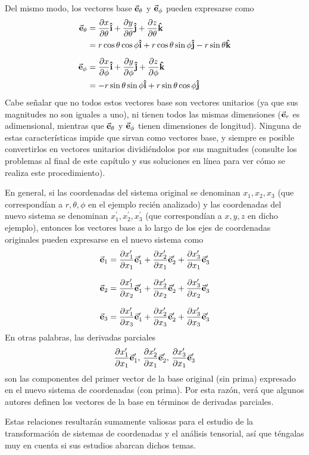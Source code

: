 \documentclass[hidelinks,12pt]{article}
\begin{document}
Del mismo modo, los vectores base $\va{e}_{\theta}$ y $\va{e}_{\phi}$ pueden expresarse como
\begin{align*}
    \va{e}_{\theta} &= \pdv{x}{\theta} \vu{i} + \pdv{y}{\theta} \vu{j} + \pdv{z}{\theta} \vu{k} \\
    &= r \cos \theta \cos \phi \vu{i} + r \cos \theta \sin \phi \vu{j} - r \sin \theta \vu{k} \\[0.5em]
    \va{e}_{\phi} &= \pdv{x}{\phi} \vu{i} + \pdv{y}{\phi} \vu{j} + \pdv{z}{\phi} \vu{k} \\
    &= - r \sin \theta \sin \phi \vu{i} + r \sin \theta \cos \phi \vu{j}
\end{align*}
Cabe señalar que no todos estos vectores base son vectores unitarios (ya que sus magnitudes no son iguales a uno), ni tienen todos las mismas dimensiones ($\va{e}_{r}$ es adimensional, mientras que $\va{e}_{\theta}$ y $\va{e}_{\phi}$ tienen dimensiones de longitud). Ninguna de estas características impide que sirvan como vectores base, y siempre es posible convertirlos en vectores unitarios dividiéndolos por sus magnitudes (consulte los problemas al final de este capítulo y sus soluciones en línea para ver cómo se realiza este procedimiento).
\par
En general, si las coordenadas del sistema original se denominan $x_{1}, x_{2}, x_{3}$ (que correspondían a $r, \theta, \phi$ en el ejemplo recién analizado) y las coordenadas del nuevo sistema se denominan $x_{1}^{\prime}, x_{2}^{\prime}, x_{3}^{\prime}$ (que correspondían a $x, y, z$ en dicho ejemplo), entonces los vectores base a lo largo de los ejes de coordenadas originales pueden expresarse en el nuevo sistema como
\begin{align}
\begin{aligned}
    \va{e}_{1} &= \pdv{x_{1}^{\prime}}{x_{1}} \va{e}_{1}^{\prime} + \pdv{x_{2}^{\prime}}{x_{1}} \va{e}_{2}^{\prime} + \pdv{x_{3}^{\prime}}{x_{1}} \va{e}_{3}^{\prime} \\[0.75em]
    \va{e}_{2} &= \pdv{x_{1}^{\prime}}{x_{2}} \va{e}_{1}^{\prime} + \pdv{x_{2}^{\prime}}{x_{2}} \va{e}_{2}^{\prime} + \pdv{x_{3}^{\prime}}{x_{2}} \va{e}_{3}^{\prime} \\[0.75em]
    \va{e}_{3} &= \pdv{x_{1}^{\prime}}{x_{3}} \va{e}_{1}^{\prime} + \pdv{x_{2}^{\prime}}{x_{3}} \va{e}_{2}^{\prime} + \pdv{x_{3}^{\prime}}{x_{3}} \va{e}_{3}^{\prime}
\end{aligned}
\label{eq:ecuacion_01_20}
\end{align}
En otras palabras, las derivadas parciales 
\begin{align*}
    \pdv{x_{1}^{\prime}}{x_{1}} \va{e}_{1}^{\prime}, \, \pdv{x_{2}^{\prime}}{x_{1}} \va{e}_{2}^{\prime}, \, \pdv{x_{3}^{\prime}}{x_{1}} \va{e}_{3}^{\prime}
\end{align*}
son las componentes del primer vector de la base original (sin prima) expresado en el nuevo sistema de coordenadas (con prima). Por esta razón, verá que algunos autores definen los vectores de la base en términos de derivadas parciales.
\par
Estas relaciones resultarán sumamente valiosas para el estudio de la transformación de sistemas de coordenadas y el análisis tensorial, así que téngalas muy en cuenta si sus estudios abarcan dichos temas.
\end{document}
